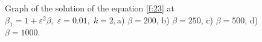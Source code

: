 \documentclass[12pt]{article} %
\newcommand{\eps}{\varepsilon}
\begin{document}
\begin{figure}[h!]
\begin{minipage}[h]{0.49\linewidth}
\end{minipage}
\begin{minipage}[h]{0.49\linewidth}
\end{minipage}
\caption{Graph of the solution of the equation \eqref{f:23} at $\beta_1=1+\eps^2\beta, \;\eps=0.01,\; k=2,$a) $\beta=200$, b) $\beta=250$, c) $\beta=500$, d) $\beta=1000$.}%
\label{fig:7}
\end{figure}






\newpage
{}
\end{document}
